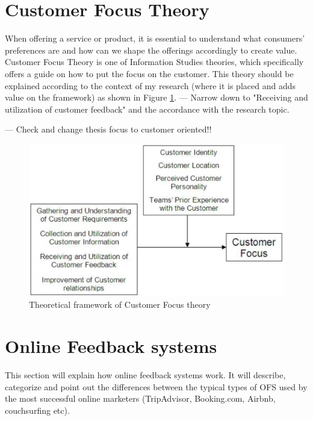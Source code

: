 \section{Customer Focus Theory}
\label{sec:CFTH}

When offering a service or product, it is essential to understand what consumers' preferences are and how can we shape the offerings accordingly to create value. Customer Focus Theory is one of Information Studies theories, which specifically offers a guide on how to put the focus on the customer. This theory should be explained according to the context of my research (where it is placed and adds value on the framework) as shown in Figure \ref{fig:CustomerFocus}. 
--- Narrow down to "Receiving and utilization of customer feedback" and the accordance with the research topic.

--- Check \cite{lohan2011examining} and change thesis focus to customer oriented!! 


\label{sec:OFS}
\begin{figure}[h!]
	\centering
	\includegraphics[height=0.3\textheight]{fig01/CustomerFocus}
	\caption{Theoretical framework of Customer Focus theory}
	\label{fig:CustomerFocus}
\end{figure}

\section{Online Feedback systems}

This section will explain how online feedback systems work. It will describe, categorize and point out the differences between the typical types of OFS used by the most successful online marketers (TripAdvisor, Booking.com, Airbnb, couchsurfing etc). 
